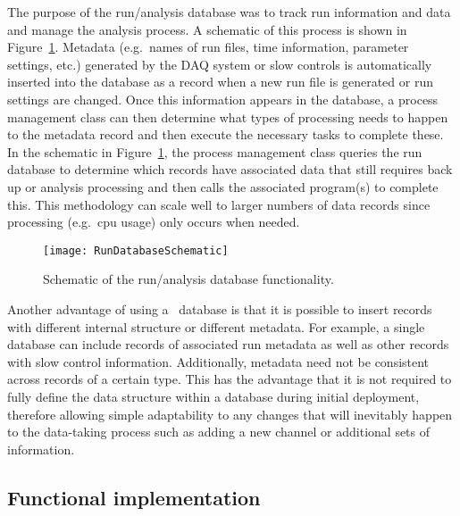 	The purpose of the run/analysis database was to track run information and
data and manage the analysis process.  A schematic of this process is shown in
Figure~\ref{fig:RunDBSchem}.  Metadata (e.g.~names of run files, time
information, parameter settings, etc.) generated by the DAQ system or slow
controls is automatically inserted into the database as a record when a new run
file is generated or run settings are changed.  Once this information appears
in the database, a process management class can then determine what types of
processing needs to happen to the metadata record and then execute the
necessary tasks to complete these.  In the schematic in
Figure~\ref{fig:RunDBSchem}, the process management class queries the run
database to determine which records have associated data that still requires
back up or analysis processing and then calls the associated program(s) to
complete this.  This methodology can scale well to larger numbers of data
records since processing (e.g.~cpu usage) only occurs when needed.  

			\begin{figure}
				\centering
				\texttt{[image: RunDatabaseSchematic]}
				\caption[Schematic of the run/analysis database functionality.]
				{Schematic of the run/analysis database functionality.}
				\label{fig:RunDBSchem}
			\end{figure}	

	Another advantage of using a \couchdb~database is that it is possible to insert records with different internal structure or different
metadata.  For example, a single database can include records of associated run metadata as well as other records with slow control information.  Additionally, metadata need not be consistent across records of a certain type.  This has the advantage that it is not required to fully define the data structure within a database during initial deployment, therefore allowing simple adaptability to any changes that will inevitably happen to the data-taking process such as adding a new channel or additional sets of information.  

		\subsection{Functional implementation}
			\lstset{
		   language=JSON,
		   extendedchars=true,
		   basicstyle=\footnotesize\ttfamily,
		   showstringspaces=false,
		   showspaces=false,
		   numbers=left,
		   numberstyle=\footnotesize,
		   numbersep=9pt,
		   tabsize=2,
		   breaklines=true,
		   showtabs=false,
		   captionpos=b}	

